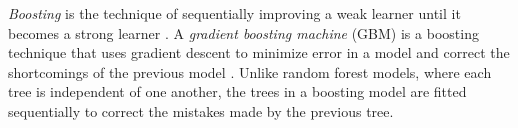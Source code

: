 \documentclass{article}
\begin{document}

	\textit{Boosting} is the technique of sequentially improving a weak learner until it becomes a strong learner \cite{schapire1990strength}. A \textit{gradient boosting machine} (GBM) is a boosting technique that uses gradient descent to minimize error in a model and correct the shortcomings of the previous model \cite{friedman2001greedy}. Unlike random forest models, where each tree is independent of one another, the trees in a boosting model are fitted sequentially to correct the mistakes made by the previous tree.
	
\end{document}
